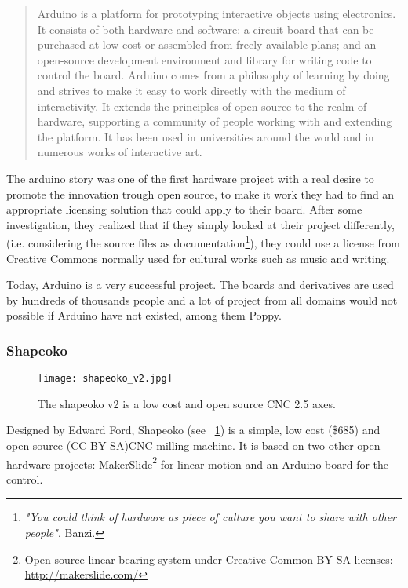 \begin{quotation}
  Arduino is a platform for prototyping interactive objects using electronics. It consists of both hardware and software: a circuit board that can be purchased at low cost or assembled from freely-available plans; and an open-source development environment and library for writing code to control the board. Arduino comes from a philosophy of learning by doing and strives to make it easy to work directly with the medium of interactivity. It extends the principles of open source to the realm of hardware, supporting a community of people working with and extending the platform. It has been used in universities around the world and in numerous works of interactive art.

\end{quotation}

The arduino story was one of the first hardware project with a real desire to promote the innovation trough open source, to make it work they had to find an appropriate licensing solution that could apply to their board. After some investigation, they realized that if they simply looked at their project differently, (i.e. considering the source files as documentation\footnote{\emph{"You could think of hardware as piece of culture you want to share with other people"}, Banzi. }), they could use a license from Creative Commons normally used for cultural works such as music and writing.

Today, Arduino is a very successful project. The boards and derivatives are used by hundreds of thousands people and a lot of project from all domains would not possible if Arduino have not existed, among them Poppy.

\subsubsection{Shapeoko}

\begin{figure}[!h]
    \begin{center}
        \texttt{[image: shapeoko\_v2.jpg]}
    \end{center}
    \caption{The shapeoko v2 is a low cost and open source CNC 2.5 axes.}
    \label{fig:shapeoko}
\end{figure}

Designed by Edward Ford, Shapeoko (see \figurename~\ref{fig:shapeoko}) is a simple, low cost (\$685) and open source (CC BY-SA)CNC milling machine. It is based on two other open hardware projects: MakerSlide\footnote{Open source linear bearing system under Creative Common BY-SA licenses: \url{http://makerslide.com/}} for linear motion and an Arduino board for the control.



